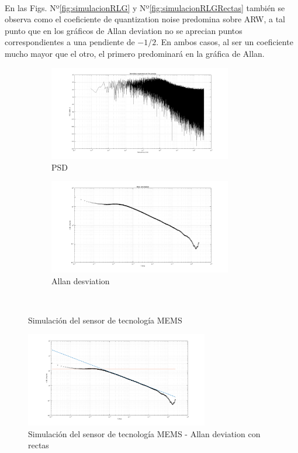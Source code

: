 \documentclass[a4paper,11pt,twoside]{IT-CNEA}
\begin{document}
\\ En las Figs. Nº\ref{fig:simulacionRLG} y Nº\ref{fig:simulacionRLGRectas} también se observa como el coeficiente de quantization noise predomina sobre ARW, a tal punto que en los gráficos de Allan deviation no se aprecian puntos correspondientes a una pendiente de $-1/2$. En ambos casos, al ser un coeficiente mucho mayor que el otro, el primero predominará en la gráfica de Allan.
\begin{figure}[t!]
    \centering
    \begin{subfigure}[t]{0.5\textwidth}
        \centering
        \includegraphics[width=8cm]{Figuras/PSDMEMS.png}
        \caption{PSD}
        \label{fig:}
    \end{subfigure}%
    \begin{subfigure}[t]{0.5\textwidth}
        \centering
        \includegraphics[width=8cm]{Figuras/AllanMEMS.png}
        \caption{Allan desviation}
        \label{fig:}
    \end{subfigure}%
    ~ 
    \caption{Simulación del sensor de tecnología MEMS}
    \label{fig:simulacionMEMs}
\end{figure}
\begin{figure}[h!]
\centering
\includegraphics[width=8cm]{Figuras/AllanMEMSRectas.png}
\caption{Simulación del sensor de tecnología MEMS - Allan deviation con rectas}
\label{fig:simulacionMEMsRectas}
\end{figure}
\end{document}
